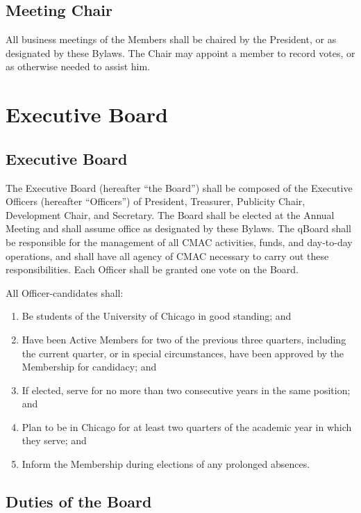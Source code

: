 \documentclass{article}
\begin{document}
\subsection{Meeting Chair}

All business meetings of the Members shall be chaired by the President,
or as designated by these Bylaws. The Chair may appoint a member to
record votes, or as otherwise needed to assist him.

\section{Executive Board} \label{board}
\subsection{Executive Board}

The Executive Board (hereafter ``the Board'') shall be composed of the Executive
Officers (hereafter ``Officers'') of President, Treasurer, Publicity Chair,
Development Chair, and Secretary. The Board shall be elected at the Annual
Meeting and shall assume office as designated by these Bylaws. The qBoard shall
be responsible for the management of all CMAC activities, funds, and day-to-day
operations, and shall have all agency of CMAC necessary to carry out these
responsibilities. Each Officer shall be granted one vote on the Board.

All Officer-candidates shall:
\begin{enumerate}
\item Be students of the University of Chicago in good standing;
and
\item Have been Active Members for two of the previous three quarters, including
the current quarter, or in special circumstances, have been approved
by the Membership for candidacy; and
\item If elected, serve for no more than two consecutive years in the same
position; and
\item Plan to be in Chicago for at least two quarters of the academic year
in which they serve; and
\item Inform the Membership during elections of any prolonged absences.
\end{enumerate}

\subsection{Duties of the Board}
\end{document}

